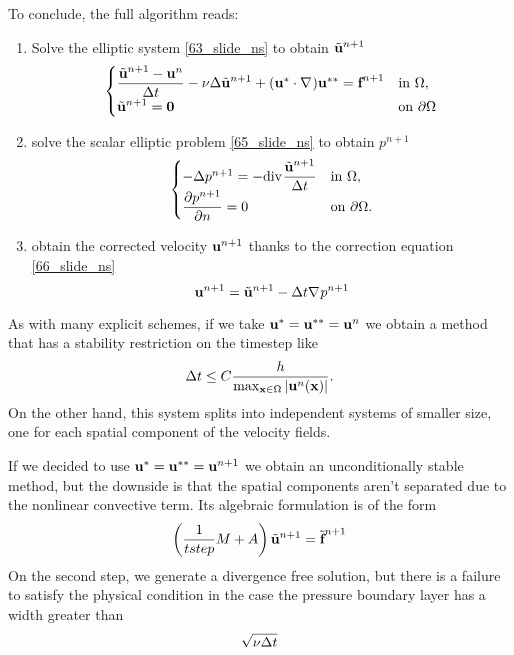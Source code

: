 To conclude, the full algorithm reads: 
\begin{enumerate}
    \item Solve the elliptic system \eqref{63_slide_ns} to obtain \(\tilde{\textbf{u}}^{n+1}\)
    \begin{equation}
        \begin{cases}
            \dfrac{\tilde{\textbf{u}}^{n+1}-\textbf{u}^n}{\Delta t} -\nu\Delta \tilde{\textbf{u}}^{n+1} + (\textbf{u}^* \cdot \nabla\mspace{1mu})\textbf{u}^{**} = \textbf{f}^{n+1} & \text{in }\Omega, \\
            \tilde{\textbf{u}}^{n+1} = \textbf{0} & \text{on }{\partial\Omega}
        \end{cases}
        \label{67_slide_ns}
    \end{equation}
    \item solve the scalar elliptic problem \eqref{65_slide_ns} to obtain \(p^{n+1}\)
    \begin{equation}
        \begin{cases}
            -\Delta p^{n+1} = -\div \dfrac{\tilde{\uvec}^{n+1}}{\tstep} & \txt{in }\Omega, \\
            \displaystyle\partialderivative{p^{n+1}}{n} = 0 & \txt{on }\boundary.
        \end{cases}
        \label{68_slide_ns}
    \end{equation}
    \item obtain the corrected velocity \(\textbf{u}^{n+1}\) thanks to the correction equation \eqref{66_slide_ns}
    \begin{equation}
        \textbf{u}^{n+1} = \tilde{\textbf{u}}^{n+1} - \Delta t \nabla\mspace{1mu} p^{n+1}
        \label{69_slide_ns}
    \end{equation}
\end{enumerate}
As with many explicit schemes, if we take \(\textbf{u}^* = \textbf{u}^{**} = \textbf{u}^n\) we obtain a method that has a stability restriction on the timestep like 
\[
    \Delta t \leq C \frac{h}{\max_{\textbf{x}\in \Omega}\abs{\textbf{u}^n(\textbf{x})}}.
\]
On the other hand, this system splits into independent systems of smaller size, one for each spatial component of the velocity fields.

If we decided to use \(\textbf{u}^* = \textbf{u}^{**} = \textbf{u}^{n+1}\) we obtain an unconditionally stable method, but the downside is that the spatial components aren't separated due to the nonlinear convective term. 
Its algebraic formulation is of the form 
\[
    \left( \frac{1}{\\tstep} M + A \right) \tilde{\textbf{u}}^{n+1} = \tilde{\textbf{f}}^{n+1}
\]
On the second step, we generate a divergence free solution, but there is a failure to satisfy the physical condition in the case the pressure boundary layer has a width greater than 
\[
    \sqrt{\nu \Delta t}
\]